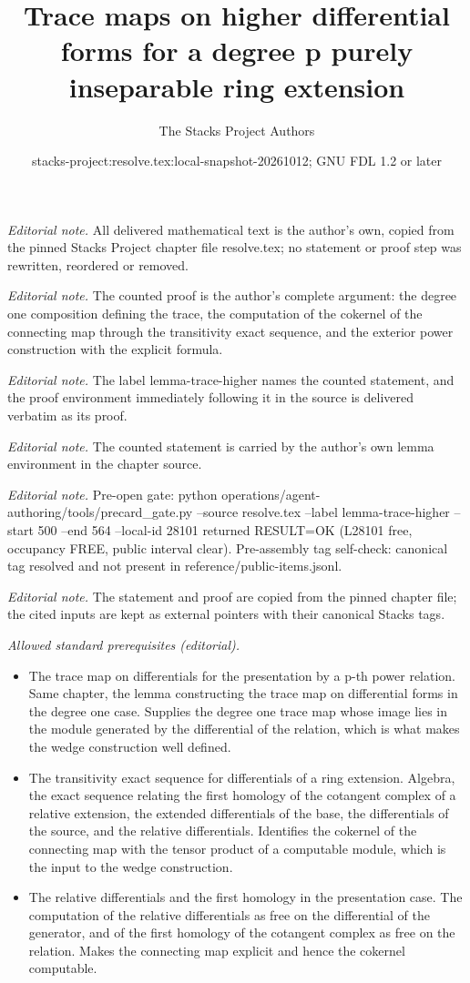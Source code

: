 \documentclass[10pt,a4paper]{amsart}
\title{Trace maps on higher differential forms for a degree p purely inseparable ring extension}
\author{The Stacks Project Authors}
\date{stacks-project:resolve.tex:local-snapshot-20261012; GNU FDL 1.2 or later}
\theoremstyle{plain}
\theoremstyle{definition}
\theoremstyle{remark}
\numberwithin{equation}{subsection}
\begin{document}
\maketitle
\noindent\textit{Editorial note.} All delivered mathematical text is the author's own, copied from the pinned Stacks Project chapter file resolve.tex; no statement or proof step was rewritten, reordered or removed.\par\medskip
\noindent\textit{Editorial note.} The counted proof is the author's complete argument: the degree one composition defining the trace, the computation of the cokernel of the connecting map through the transitivity exact sequence, and the exterior power construction with the explicit formula.\par\medskip
\noindent\textit{Editorial note.} The label lemma-trace-higher names the counted statement, and the proof environment immediately following it in the source is delivered verbatim as its proof.\par\medskip
\noindent\textit{Editorial note.} The counted statement is carried by the author's own lemma environment in the chapter source.\par\medskip
\noindent\textit{Editorial note.} Pre-open gate: python operations/agent-authoring/tools/precard\_gate.py --source resolve.tex --label lemma-trace-higher --start 500 --end 564 --local-id 28101 returned RESULT=OK (L28101 free, occupancy FREE, public interval clear). Pre-assembly tag self-check: canonical tag resolved and not present in reference/public-items.jsonl.\par\medskip
\noindent\textit{Editorial note.} The statement and proof are copied from the pinned chapter file; the cited inputs are kept as external pointers with their canonical Stacks tags.\par\medskip
\noindent\textit{Allowed standard prerequisites (editorial).}\begin{itemize}
\item The trace map on differentials for the presentation by a p-th power relation. Same chapter, the lemma constructing the trace map on differential forms in the degree one case. Supplies the degree one trace map whose image lies in the module generated by the differential of the relation, which is what makes the wedge construction well defined.
\item The transitivity exact sequence for differentials of a ring extension. Algebra, the exact sequence relating the first homology of the cotangent complex of a relative extension, the extended differentials of the base, the differentials of the source, and the relative differentials. Identifies the cokernel of the connecting map with the tensor product of a computable module, which is the input to the wedge construction.
\item The relative differentials and the first homology in the presentation case. The computation of the relative differentials as free on the differential of the generator, and of the first homology of the cotangent complex as free on the relation. Makes the connecting map explicit and hence the cokernel computable.
\end{itemize}\medskip
\end{document}
